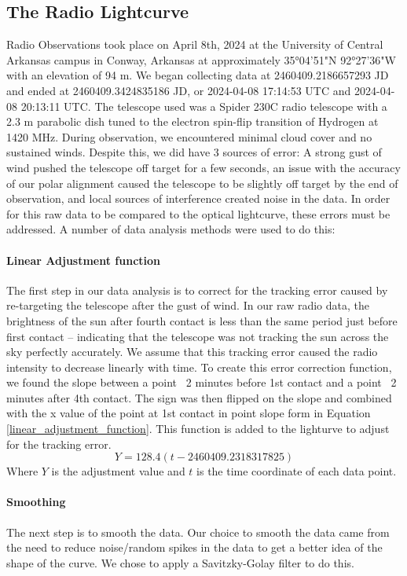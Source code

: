 \subsection{\label{sec:radio}The Radio Lightcurve}
Radio Observations took place on April 8th, 2024 at the University of Central Arkansas campus in Conway, Arkansas at approximately 35°04'51"N 92°27'36"W with an elevation of 94 m.
We began collecting data at 2460409.2186657293 JD and ended at 2460409.3424835186 JD, or 2024-04-08 17:14:53 UTC and 2024-04-08 20:13:11 UTC.
The telescope used was a Spider 230C radio telescope with a 2.3 m parabolic dish tuned to the electron spin-flip transition of Hydrogen at 1420 MHz.
During observation, we encountered minimal cloud cover and no sustained winds.
Despite this, we did have 3 sources of error: A strong gust of wind pushed the telescope off target for a few seconds, an issue with the accuracy of our polar alignment caused the telescope to be slightly off target by the end of observation, and local sources of interference created noise in the data.
In order for this raw data to be compared to the optical lightcurve, these errors must be addressed.
A number of data analysis methods were used to do this:
\paragraph{Linear Adjustment function}
The first step in our data analysis is to correct for the tracking error caused by re-targeting the telescope after the gust of wind.
In our raw radio data, the brightness of the sun after fourth contact is less than the same period just before first contact -- indicating that the telescope was not tracking the sun across the sky perfectly accurately.
We assume that this tracking error caused the radio intensity to decrease linearly with time.
To create this error correction function, we found the slope between a point ~2 minutes before 1st contact and a point ~2 minutes after 4th contact. 
The sign was then flipped on the slope and combined with the x value of the point at 1st contact in point slope form in Equation \ref{linear_adjustment_function}.
This function is added to the lighturve to adjust for the tracking error.
\begin{equation}\label{linear_adjustment_function}
Y = 128.4(t-2460409.2318317825)
\end{equation}
Where $Y$ is the adjustment value and $t$ is the time coordinate of each data point. 
\paragraph{Smoothing}
The next step is to smooth the data.
Our choice to smooth the data came from the need to reduce noise/random spikes in the data to get a better idea of the shape of the curve.
We chose to apply a Savitzky-Golay filter \cite{savitzky_golay_1964} to do this.
